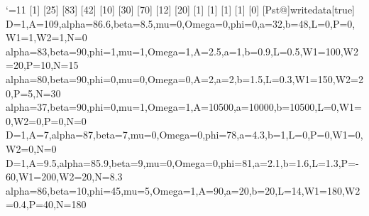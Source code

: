 \edef\PstAtCode{\the\catcode`\@} \catcode`\@=11\relax
{}
[1]{\def\pst@shell@D{#1 }} %
[25]{\def\pst@shell@A{#1 }} %
[83]{\def\pst@shell@alpha{#1 }} %
[42]{\def\pst@shell@beta{#1 }} %
[10]{\def\pst@shell@mu{#1 }} %
[30]{\def\pst@shell@Omega{#1 }} %
[70]{\def\pst@shell@phi{#1 }} %
[12]{\def\pst@shell@a{#1 }} %
[20]{\def\pst@shell@b{#1 }} %
[1]{\def\pst@shell@L{#1 }} %
[1]{\def\pst@shell@P{#1 }} %
[1]{\def\pst@shell@Wi{#1 }} %
[1]{\def\pst@shell@Wii{#1 }}
[0]{\def\pst@shell@N{#1 }}
[Pst@]{writedata}[true]{}
%
%
\def\pst@shell@variables{
  /shell@D \pst@shell@D def
  /shell@A \pst@shell@A def 
  /shell@alpha \pst@shell@alpha def
  /shell@beta \pst@shell@beta def
  /shell@mu \pst@shell@mu def
  /shell@Omega \pst@shell@Omega def
  /shell@phi \pst@shell@phi def
  /shell@a \pst@shell@a def
  /shell@b \pst@shell@b def
  /shell@L \pst@shell@L def
  /shell@P \pst@shell@P def
  /shell@Wi \pst@shell@Wi def
  /shell@Wii \pst@shell@Wii def
  /shell@N \pst@shell@N def
}
%
%
  {D=1,A=109,alpha=86.6,beta=8.5,mu=0,Omega=0,phi=0,a=32,b=48,L=0,P=0,W1=1,W2=1,N=0}
%
  {alpha=83,beta=90,phi=1,mu=1,Omega=1,A=2.5,a=1,b=0.9,L=0.5,W1=100,W2=20,P=10,N=15}
%
  {alpha=80,beta=90,phi=0,mu=0,Omega=0,A=2,a=2,b=1.5,L=0.3,W1=150,W2=20,P=5,N=30}%
%
  {alpha=37,beta=90,phi=0,mu=1,Omega=1,A=10500,a=10000,b=10500,L=0,W1=0,W2=0,P=0,N=0}
%
  {D=1,A=7,alpha=87,beta=7,mu=0,Omega=0,phi=78,a=4.3,b=1,L=0,P=0,W1=0,W2=0,N=0}
%
  {D=1,A=9.5,alpha=85.9,beta=9,mu=0,Omega=0,phi=81,a=2.1,b=1.6,L=1.3,P=-60,W1=200,W2=20,N=8.3}
%
  {alpha=86,beta=10,phi=45,mu=5,Omega=1,A=90,a=20,b=20,L=14,W1=180,W2=0.4,P=40,N=180}
